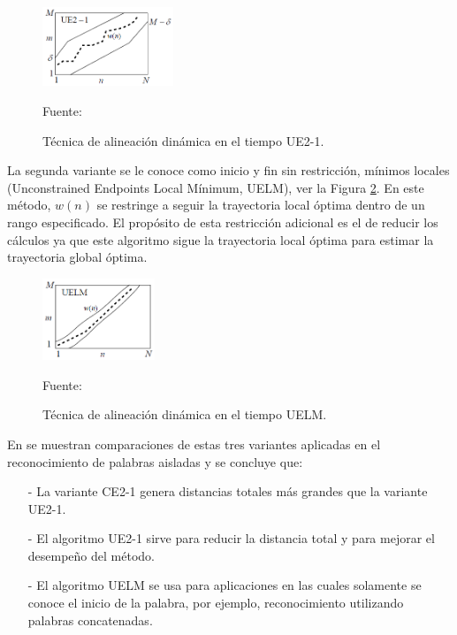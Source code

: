 \begin{enumerate}
\vskip 0.2cm
\begin{figure}[H]
\begin{center}
\includegraphics[width=0.35\textwidth]{Imagenes/Cap2/image051}
\end{center}
\begin{center}
\vskip -0.5cm
\caption{\small{Técnica de alineación dinámica en el tiempo UE2-1.}}
\label{fig:figura2.50}
{\small{Fuente: \cite{rabiner}}}
\end{center}
\end{figure}
La segunda variante se le conoce como inicio y fin sin restricción, mínimos locales (Unconstrained Endpoints Local Mínimum, UELM), ver la Figura \ref{fig:figura2.51}. En este método, $w(n)$ se restringe a seguir la trayectoria local óptima dentro de un rango especificado.  El propósito de esta restricción adicional es el de reducir los cálculos ya que este algoritmo sigue la trayectoria local óptima para estimar la trayectoria global óptima.
\begin{figure}[H]
\begin{center}
\includegraphics[width=0.3\textwidth]{Imagenes/Cap2/image052}
\end{center}
\begin{center}
\vskip -0.5cm
\caption{\small{Técnica de alineación dinámica en el tiempo UELM.}}
\label{fig:figura2.51}
{\small{Fuente: \cite{rabiner}}}
\end{center}
\end{figure}

En \cite{rabiner2} se muestran comparaciones de estas tres variantes aplicadas en el reconocimiento de palabras aisladas y se concluye que:
\begin{enumerate}
\item[-]La variante CE2-1 genera distancias totales más grandes que la variante UE2-1.
\item[-]El algoritmo UE2-1 sirve para reducir la distancia total y para mejorar el desempeño del método.
\item[-]El algoritmo UELM se usa para aplicaciones en las cuales solamente se conoce el inicio de la palabra, por ejemplo, reconocimiento utilizando palabras concatenadas.
\end{enumerate}


\end{enumerate}
